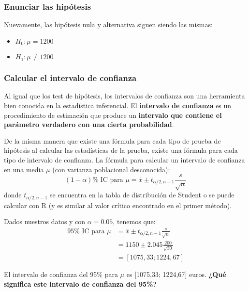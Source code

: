 \documentclass[
]{book}
\providecommand{\tightlist}{%
  \setlength{\itemsep}{0pt}\setlength{\parskip}{0pt}}
\begin{document}
\hypertarget{enunciar-las-hipuxf3tesis}{%
\subsubsection{Enunciar las hipótesis}\label{enunciar-las-hipuxf3tesis}}

Nuevamente, las hipótesis nula y alternativa siguen siendo las mismas:

\begin{itemize}
\tightlist
\item
  \(H_0:\mu = 1200\)
\item
  \(H_1:\mu\ne 1200\)
\end{itemize}

\hypertarget{calcular-el-intervalo-de-confianza}{%
\subsubsection{Calcular el intervalo de confianza}\label{calcular-el-intervalo-de-confianza}}

Al igual que los test de hipótesis, los intervalos de confianza son una herramienta bien conocida en la estadística inferencial. El \textbf{intervalo de confianza} es un procedimiento de estimación que produce un \textbf{intervalo que contiene el parámetro verdadero con una cierta probabilidad}.

De la misma manera que existe una fórmula para cada tipo de prueba de hipótesis al calcular las estadísticas de la prueba, existe una fórmula para cada tipo de intervalo de confianza. La fórmula para calcular un intervalo de confianza en una media \(\mu\) (con varianza poblacional desconocida):
\[
(1-\alpha)\% \text{ IC para } \mu=\overline{x}\pm t_{\alpha/2, n - 1}\frac{s}{\sqrt{n}}
\]
donde \(t_{\alpha/2, n-1}\) se encuentra en la tabla de distribución de Student o se puede calcular con R (y es similar al valor crítico encontrado en el primer método).

Dados nuestros datos y con \(\alpha= 0.05\), tenemos que:
\[
\begin{aligned}
 95\%\text{ IC para } \mu 
    &= \bar{x} \pm t_{\alpha/2, n - 1} \frac{s}{\sqrt{n}} \\
    &= 1150 \pm 2.045 \frac{200}{\sqrt{30}} \\
    &= [1075,33; 1224,67]
\end{aligned}
\]

El intervalo de confianza del 95\% para \(\mu\) es {[}1075,33; 1224,67{]} euros. \textbf{¿Qué significa este intervalo de confianza del 95\%? }
\end{document}
